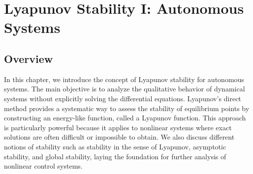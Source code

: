 \chapterspaceabove{6.75cm} %
\chapterspacebelow{7.25cm} %

\chapter{Lyapunov Stability I: Autonomous Systems}

\section{Overview}
In this chapter, we introduce the concept of Lyapunov stability for autonomous systems. The main objective is to analyze the qualitative behavior of dynamical systems without explicitly solving the differential equations. Lyapunov’s direct method provides a systematic way to assess the stability of equilibrium points by constructing an energy-like function, called a Lyapunov function. 
This approach is particularly powerful because it applies to nonlinear systems where exact solutions are often difficult or impossible to obtain. We also discuss different notions of stability such as stability in the sense of Lyapunov, asymptotic stability, and global stability, laying the foundation for further analysis of nonlinear control systems.

\section{}